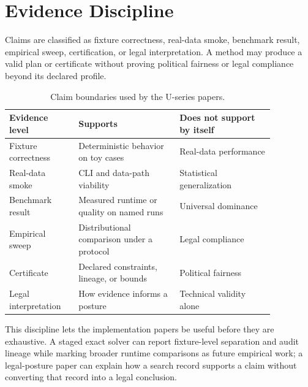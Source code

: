 \section{Evidence Discipline}

Claims are classified as fixture correctness, real-data smoke, benchmark
result, empirical sweep, certification, or legal interpretation. A method may
produce a valid plan or certificate without proving political fairness or legal
compliance beyond its declared profile.

\begin{table}[htbp]
\centering
\small
\begin{tabular}{p{0.22\linewidth}p{0.33\linewidth}p{0.31\linewidth}}
\toprule
Evidence level & Supports & Does not support by itself \\
\midrule
Fixture correctness & Deterministic behavior on toy cases & Real-data performance \\
Real-data smoke & CLI and data-path viability & Statistical generalization \\
Benchmark result & Measured runtime or quality on named runs & Universal dominance \\
Empirical sweep & Distributional comparison under a protocol & Legal compliance \\
Certificate & Declared constraints, lineage, or bounds & Political fairness \\
Legal interpretation & How evidence informs a posture & Technical validity alone \\
\bottomrule
\end{tabular}
\caption{Claim boundaries used by the U-series papers.}
\end{table}

This discipline lets the implementation papers be useful before they are
exhaustive. A staged exact solver can report fixture-level separation and audit
lineage while marking broader runtime comparisons as future empirical work; a
legal-posture paper can explain how a search record supports a claim without
converting that record into a legal conclusion.
